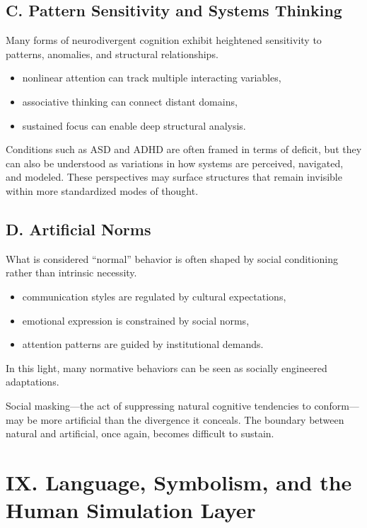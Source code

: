 \documentclass[12pt]{article}
\begin{document}
\subsection*{C. Pattern Sensitivity and Systems Thinking}

Many forms of neurodivergent cognition exhibit heightened sensitivity to patterns, anomalies, and structural relationships.

\begin{itemize}
    \item nonlinear attention can track multiple interacting variables,
    \item associative thinking can connect distant domains,
    \item sustained focus can enable deep structural analysis.
\end{itemize}

Conditions such as ASD and ADHD are often framed in terms of deficit, but they can also be understood as variations in how systems are perceived, navigated, and modeled. These perspectives may surface structures that remain invisible within more standardized modes of thought.

\subsection*{D. Artificial Norms}

What is considered “normal” behavior is often shaped by social conditioning rather than intrinsic necessity.

\begin{itemize}
    \item communication styles are regulated by cultural expectations,
    \item emotional expression is constrained by social norms,
    \item attention patterns are guided by institutional demands.
\end{itemize}

In this light, many normative behaviors can be seen as socially engineered adaptations.

Social masking—the act of suppressing natural cognitive tendencies to conform—may be more artificial than the divergence it conceals. The boundary between natural and artificial, once again, becomes difficult to sustain.

\section*{IX. Language, Symbolism, and the Human Simulation Layer}
\end{document}
